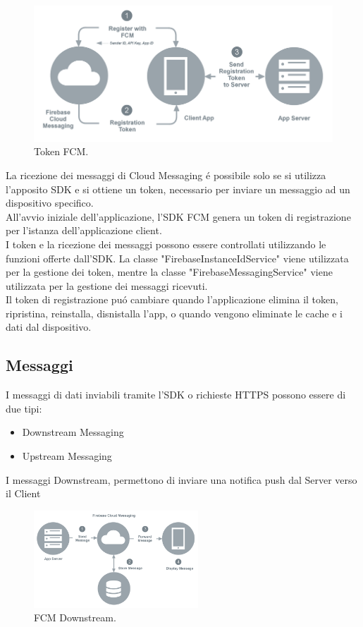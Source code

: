 \begin{figure}[!hb]
  \centering
  \includegraphics[width=1\textwidth]{immagini/fcm_token.png}
  \caption{Token FCM.}
  \label{fig:Token FCM}
\end{figure}

\newpage
La ricezione dei messaggi di Cloud Messaging \'e possibile solo se si utilizza l'apposito SDK e si ottiene un token, necessario per inviare un messaggio ad un dispositivo specifico.\\
All'avvio iniziale dell'applicazione, l'SDK FCM genera un token di registrazione per l'istanza dell'applicazione client.\\
I token e la ricezione dei messaggi possono essere controllati utilizzando le funzioni offerte dall'SDK.
La classe "FirebaseInstanceIdService" viene utilizzata per la gestione dei token, mentre la classe "FirebaseMessagingService" viene utilizzata per la gestione dei messaggi ricevuti.\\
Il token di registrazione pu\'o cambiare quando l'applicazione elimina il token, ripristina, reinstalla, disnistalla l'app, o quando vengono eliminate le cache e i dati dal dispositivo.


\subsection{Messaggi}
I messaggi di dati inviabili tramite l'SDK o richieste HTTPS possono essere di due tipi:
\begin{itemize}
    \item Downstream Messaging
    \item Upstream Messaging
\end{itemize}

I messaggi Downstream, permettono di inviare una notifica push dal Server verso il Client

\begin{figure}[!hb]
  \centering
  \includegraphics[width=0.55\textwidth]{immagini/fcm_down.png}
  \caption{FCM Downstream.}
  \label{fig:FCM Downstream}
\end{figure}





